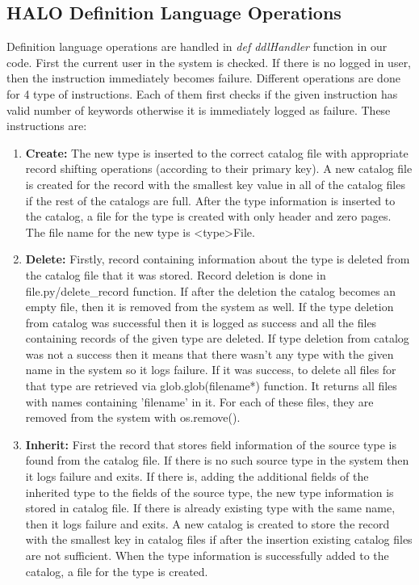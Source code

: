 \documentclass{article}
\begin{document}
\subsection{HALO Definition Language Operations}
Definition language operations are handled in \emph{def ddlHandler} function in our code. First the current user in the system is checked. If there is no logged in user, then the instruction immediately becomes failure. Different operations are done for 4 type of instructions. Each of them first checks if the given instruction has valid number of keywords otherwise it is immediately logged as failure. These instructions are:
\begin{enumerate}
    \item \textbf{Create:} The new type is inserted to the correct catalog file with appropriate record shifting operations (according to their primary key). A new catalog file is created for the record with the smallest key value in all of the catalog files if the rest of the catalogs are full. After the type information is inserted to the catalog, a file for the type is created with only header and zero pages. The file name for the new type is \textless type\textgreater File.
    \item \textbf{Delete:} Firstly, record containing information about the type is deleted from the catalog file that it was stored. Record deletion is done in file.py\slash delete\_record function. If after the deletion the catalog becomes an empty file, then it is removed from the system as well. If the type deletion from catalog was successful then it is logged as success and all the files containing records of the given type are deleted. If type deletion from catalog was not a success then it means that there wasn't any type with the given name in the system so it logs failure. If it was success, to delete all files for that type are retrieved via glob.glob(filename*) function. It returns all files with names containing 'filename' in it. For each of these files, they are removed from the system with os.remove(). 
    \item \textbf{Inherit:} First the record that stores field information of the source type is found from the catalog file. If there is no such source type in the system then it logs failure and exits. If there is, adding the additional fields of the inherited type to the fields of the source type, the new type information is stored in catalog file. If there is already existing type with the same name, then it logs failure and exits. A new catalog is created to store the record with the smallest key in catalog files if after the insertion existing catalog files are not sufficient. When the type information is successfully added to the catalog, a file for the type is created.

\end{enumerate}
\end{document}
